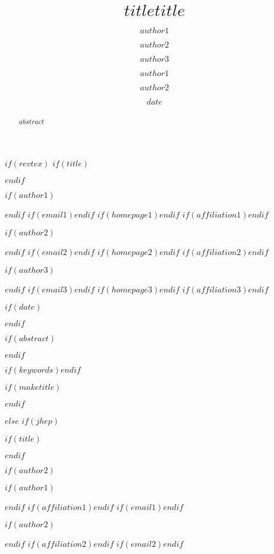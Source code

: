 \documentclass[$if(fontsize)$$fontsize$,$endif$$if(lang)$$lang$,$endif$$if(papersize)$$papersize$,$endif$$for(classoption)$$classoption$$sep$,$endfor$]{$documentclass$}
\begin{document}


$if(revtex)$
$if(title)$\title{$title$}$endif$

$if(author1)$\author{$author1$}$endif$
$if(email1)$$endif$
$if(homepage1)$$endif$
$if(affiliation1)$$endif$

$if(author2)$\author{$author2$}$endif$
$if(email2)$$endif$
$if(homepage2)$$endif$
$if(affiliation2)$$endif$

$if(author3)$\author{$author3$}$endif$
$if(email3)$$endif$
$if(homepage3)$$endif$
$if(affiliation3)$$endif$

$if(date)$\date{$date$}$endif$

$if(abstract)$
\begin{abstract}
\setlength{\parskip}{6pt} %
$abstract$
\end{abstract}
$endif$

$if(keywords)$$endif$

$if(maketitle)$\maketitle$endif$

$else$
$if(jhep)$

$if(title)$\title{\boldmath $title$}$endif$

$if(author2)$

$if(author1)$\author[a]{$author1$}$endif$
$if(affiliation1)$$endif$
$if(email1)$$endif$

$if(author2)$\author[b]{$author2$}$endif$
$if(affiliation2)$$endif$
$if(email2)$$endif$
\end{document}
